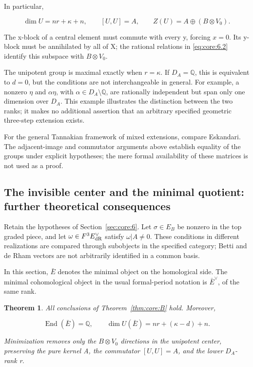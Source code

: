 \documentclass[11pt,a4paper,oneside]{article}
\theoremstyle{plain}
\newtheorem{theorem}{Theorem}[section]
\theoremstyle{definition}
\theoremstyle{remark}
\numberwithin{equation}{section}
\begin{document}
In particular,

\begin{equation}
\dim U=nr+\kappa+n,\qquad [U,U]=A,\qquad
 Z(U)=A\oplus(B\otimes V_0).                            \label{eq:core:6.5}
\end{equation}

The x-block of a central element must commute with every y, forcing \(x=0\). Its y-block must be annihilated by all of X; the rational relations in \eqref{eq:core:6.2} identify this subspace with \(B\otimes V_{0}\).

The unipotent group is maximal exactly when \(r=\kappa \). If \(D_A=\mathbb Q\), this is equivalent to \(d=0\), but the conditions are not interchangeable in general. For example, a nonzero \(\eta \) and \(\alpha\eta\), with \(\alpha\in D_A\setminus\mathbb Q\), are rationally independent but span only one dimension over \(D_A\). This example illustrates the distinction between the two ranks; it makes no additional assertion that an arbitrary specified geometric three-step extension exists.

For the general Tannakian framework of mixed extensions, compare Eskandari. \cite{eskandari} The adjacent-image and commutator arguments above establish equality of the groups under explicit hypotheses; the mere formal availability of these matrices is not used as a proof.


\subsection{The invisible center and the minimal quotient: further theoretical consequences}\label{sec:core:7}

Retain the hypotheses of Section~\ref{sec:core:6}. Let \(\sigma \in E_B\) be nonzero in the top graded piece, and let \(\omega\in F^3E_{\rm dR}^\vee\) satisfy \(\omega|A\ne0\). These conditions in different realizations are compared through subobjects in the specified category; Betti and de Rham vectors are not arbitrarily identified in a common basis.

In this section, \(\bar E\) denotes the minimal object on the homological side. The minimal cohomological object in the usual formal-period notation is \(\bar E^\vee\), of the same rank.

\begin{theorem}

\label{thm:core:7.1} All conclusions of Theorem~\ref{thm:core:B} hold. Moreover,

\begin{equation}
\operatorname{End}(\bar E)=\mathbb Q,\qquad
 \dim U(\bar E)=nr+(\kappa-d)+n.                         \label{eq:core:7.1}
\end{equation}

Minimization removes only the \(B\otimes V_{0}\) directions in the unipotent center, preserving the pure kernel A, the commutator \([U,U]=A\), and the lower \(D_A\)-rank r.

\end{theorem}
\end{document}
